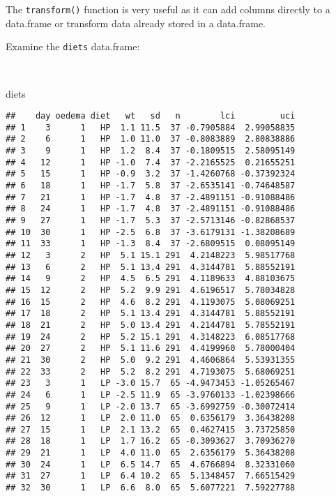 \documentclass[
  12pt,
  a4paper]{book}
\newenvironment{Shaded}{\begin{snugshade}}{\end{snugshade}}
\newcommand{\NormalTok}[1]{#1}
\begin{document}
The \texttt{transform()} function is very useful as it can add columns directly to a data.frame or transform data already stored in a data.frame.

\newpage

Examine the \texttt{diets} data.frame:

~

\begin{Shaded}
\begin{Highlighting}[]
\NormalTok{diets}
\end{Highlighting}
\end{Shaded}

\begin{verbatim}
##    day oedema diet   wt   sd   n        lci         uci
## 1    3      1   HP  1.1 11.5  37 -0.7905884  2.99058835
## 2    6      1   HP  1.0 11.0  37 -0.8083889  2.80838886
## 3    9      1   HP  1.2  8.4  37 -0.1809515  2.58095149
## 4   12      1   HP -1.0  7.4  37 -2.2165525  0.21655251
## 5   15      1   HP -0.9  3.2  37 -1.4260768 -0.37392324
## 6   18      1   HP -1.7  5.8  37 -2.6535141 -0.74648587
## 7   21      1   HP -1.7  4.8  37 -2.4891151 -0.91088486
## 8   24      1   HP -1.7  4.8  37 -2.4891151 -0.91088486
## 9   27      1   HP -1.7  5.3  37 -2.5713146 -0.82868537
## 10  30      1   HP -2.5  6.8  37 -3.6179131 -1.38208689
## 11  33      1   HP -1.3  8.4  37 -2.6809515  0.08095149
## 12   3      2   HP  5.1 15.1 291  4.2148223  5.98517768
## 13   6      2   HP  5.1 13.4 291  4.3144781  5.88552191
## 14   9      2   HP  4.5  6.5 291  4.1189633  4.88103675
## 15  12      2   HP  5.2  9.9 291  4.6196517  5.78034828
## 16  15      2   HP  4.6  8.2 291  4.1193075  5.08069251
## 17  18      2   HP  5.1 13.4 291  4.3144781  5.88552191
## 18  21      2   HP  5.0 13.4 291  4.2144781  5.78552191
## 19  24      2   HP  5.2 15.1 291  4.3148223  6.08517768
## 20  27      2   HP  5.1 11.6 291  4.4199960  5.78000404
## 21  30      2   HP  5.0  9.2 291  4.4606864  5.53931355
## 22  33      2   HP  5.2  8.2 291  4.7193075  5.68069251
## 23   3      1   LP -3.0 15.7  65 -4.9473453 -1.05265467
## 24   6      1   LP -2.5 11.9  65 -3.9760133 -1.02398666
## 25   9      1   LP -2.0 13.7  65 -3.6992759 -0.30072414
## 26  12      1   LP  2.0 11.0  65  0.6356179  3.36438208
## 27  15      1   LP  2.1 13.2  65  0.4627415  3.73725850
## 28  18      1   LP  1.7 16.2  65 -0.3093627  3.70936270
## 29  21      1   LP  4.0 11.0  65  2.6356179  5.36438208
## 30  24      1   LP  6.5 14.7  65  4.6766894  8.32331060
## 31  27      1   LP  6.4 10.2  65  5.1348457  7.66515429
## 32  30      1   LP  6.6  8.0  65  5.6077221  7.59227788

\end{verbatim}
\end{document}
